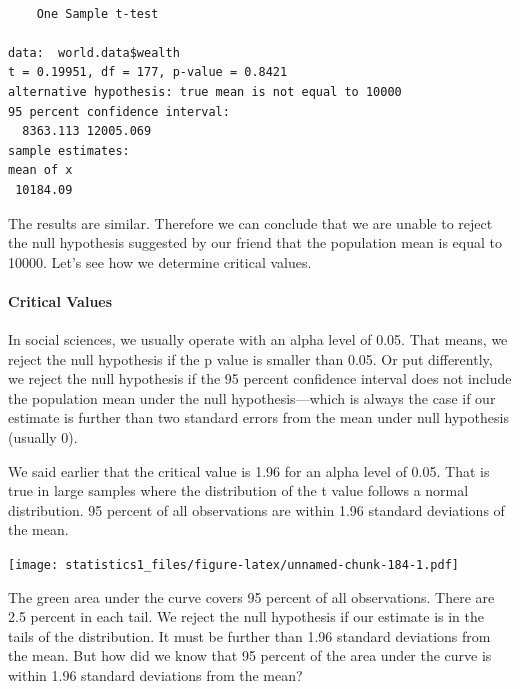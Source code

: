 \documentclass[]{article}
\newenvironment{Shaded}{\begin{snugshade}}{\end{snugshade}}
\newcommand{\KeywordTok}[1]{\textcolor[rgb]{0.13,0.29,0.53}{\textbf{#1}}}
\newcommand{\DataTypeTok}[1]{\textcolor[rgb]{0.13,0.29,0.53}{#1}}
\newcommand{\DecValTok}[1]{\textcolor[rgb]{0.00,0.00,0.81}{#1}}
\newcommand{\StringTok}[1]{\textcolor[rgb]{0.31,0.60,0.02}{#1}}
\newcommand{\OperatorTok}[1]{\textcolor[rgb]{0.81,0.36,0.00}{\textbf{#1}}}
\newcommand{\NormalTok}[1]{#1}
\let\oldparagraph\paragraph
\renewcommand{\paragraph}[1]{\oldparagraph{#1}\mbox{}}
\theoremstyle{definition}
\theoremstyle{definition}
\theoremstyle{definition}
\theoremstyle{remark}
\begin{document}
\begin{Shaded}
\end{Shaded}

\begin{verbatim}

    One Sample t-test

data:  world.data$wealth
t = 0.19951, df = 177, p-value = 0.8421
alternative hypothesis: true mean is not equal to 10000
95 percent confidence interval:
  8363.113 12005.069
sample estimates:
mean of x 
 10184.09 
\end{verbatim}

The results are similar. Therefore we can conclude that we are unable to
reject the null hypothesis suggested by our friend that the population
mean is equal to 10000. Let's see how we determine critical values.

\paragraph{Critical Values}\label{critical-values}

In social sciences, we usually operate with an alpha level of 0.05. That
means, we reject the null hypothesis if the p value is smaller than
0.05. Or put differently, we reject the null hypothesis if the 95
percent confidence interval does not include the population mean under
the null hypothesis---which is always the case if our estimate is
further than two standard errors from the mean under null hypothesis
(usually 0).

We said earlier that the critical value is 1.96 for an alpha level of
0.05. That is true in large samples where the distribution of the t
value follows a normal distribution. 95 percent of all observations are
within 1.96 standard deviations of the mean.

\texttt{[image: statistics1\_files/figure-latex/unnamed-chunk-184-1.pdf]}

The green area under the curve covers 95 percent of all observations.
There are 2.5 percent in each tail. We reject the null hypothesis if our
estimate is in the tails of the distribution. It must be further than
1.96 standard deviations from the mean. But how did we know that 95
percent of the area under the curve is within 1.96 standard deviations
from the mean?
\end{document}
